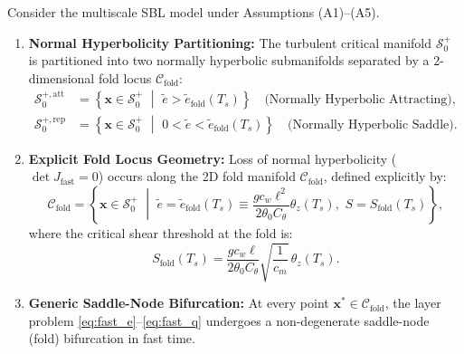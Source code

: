 \begin{theorem}
\label{thm:fold_characterization}
Consider the multiscale SBL model under Assumptions \textnormal{(A1)--(A5)}.
\begin{enumerate}
    \item \textbf{Normal Hyperbolicity Partitioning:} The turbulent critical manifold $\mathcal{S}_0^+$ is partitioned into two normally hyperbolic submanifolds separated by a 2-dimensional fold locus $\mathcal{C}_{\mathrm{fold}}$:
    \begin{align}
    \mathcal{S}_0^{+,\mathrm{att}} &= \left\{ \mathbf{x} \in \mathcal{S}_0^+ \,\,\middle\vert\,\, \tilde e > \tilde e_{\mathrm{fold}}(T_s) \right\} \quad \text{(Normally Hyperbolic Attracting)}, \\
    \mathcal{S}_0^{+,\mathrm{rep}} &= \left\{ \mathbf{x} \in \mathcal{S}_0^+ \,\,\middle\vert\,\, 0 < \tilde e < \tilde e_{\mathrm{fold}}(T_s) \right\} \quad \text{(Normally Hyperbolic Saddle)}.
    \end{align}

    \item \textbf{Explicit Fold Locus Geometry:} Loss of normal hyperbolicity ($\det J_{\mathrm{fast}} = 0$) occurs along the 2D fold manifold $\mathcal{C}_{\mathrm{fold}}$, defined explicitly by:
    \begin{equation}
    \mathcal{C}_{\mathrm{fold}} = \left\{ \mathbf{x} \in \mathcal{S}_0^+ \,\,\middle\vert\,\, \tilde e = \tilde e_{\mathrm{fold}}(T_s) \equiv \frac{g c_w \ell^2}{2\theta_0 C_\theta} \theta_z(T_s), \,\, S = S_{\mathrm{fold}}(T_s) \right\},
    \end{equation}
    where the critical shear threshold at the fold is:
    \begin{equation}
    S_{\mathrm{fold}}(T_s) = \frac{g c_w \ell}{2\theta_0 C_\theta} \sqrt{\frac{1}{c_m}} \, \theta_z(T_s).
    \label{eq:S_fold}
    \end{equation}

    \item \textbf{Generic Saddle-Node Bifurcation:} At every point $\mathbf{x}^* \in \mathcal{C}_{\mathrm{fold}}$, the layer problem \eqref{eq:fast_e}--\eqref{eq:fast_q} undergoes a non-degenerate saddle-node (fold) bifurcation in fast time.
\end{enumerate}
\end{theorem}

